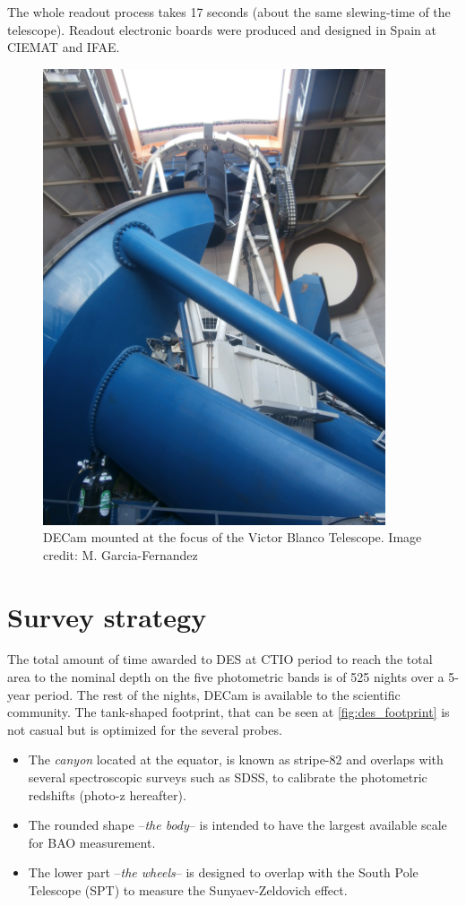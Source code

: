 The whole readout process takes 17 seconds (about the same slewing-time of the telescope). Readout electronic boards were produced and designed in Spain at CIEMAT and IFAE.
\begin{figure}
\begin{center}
\includegraphics[width=0.9\textwidth]{./Pictures/telescope_DES_mine.jpg}
\caption{DECam mounted at the focus of the Victor Blanco Telescope. Image credit: M. Garcia-Fernandez}
\label{fig:decam}
\end{center}
\end{figure}

\section{Survey strategy}
The total amount of time awarded to DES at CTIO period to reach the total area to the nominal depth on the five photometric bands is of 525 nights over a 5-year period. The rest of the nights, DECam is available to the scientific community. The tank-shaped footprint, that can be seen at \autoref{fig:des_footprint} is not casual but is optimized for the several probes.
\begin{itemize}
	\item The {\it canyon} located at the equator, is known as stripe-82 and overlaps with several spectroscopic surveys such as SDSS, to calibrate the photometric redshifts (photo-z hereafter).
    \item The rounded shape --{\it the body}-- is intended to have the largest available scale for BAO measurement.
    \item The lower part --{\it the wheels}-- is designed to overlap with the South Pole Telescope (SPT) to measure the Sunyaev-Zeldovich effect.
\end{itemize}

